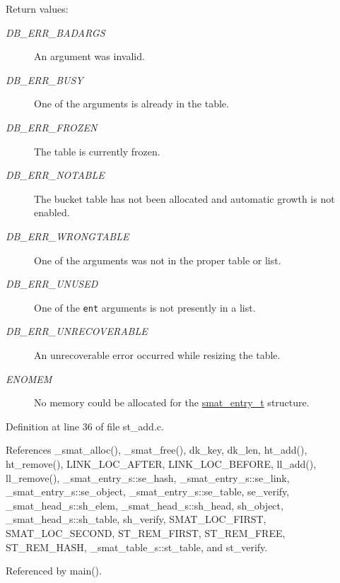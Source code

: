 \begin{Desc}
\item[Return values:]
\begin{description}
\item[{\em DB\_\-ERR\_\-BADARGS}]An argument was invalid. \item[{\em DB\_\-ERR\_\-BUSY}]One of the arguments is already in the table. \item[{\em DB\_\-ERR\_\-FROZEN}]The table is currently frozen. \item[{\em DB\_\-ERR\_\-NOTABLE}]The bucket table has not been allocated and automatic growth is not enabled. \item[{\em DB\_\-ERR\_\-WRONGTABLE}]One of the arguments was not in the proper table or list. \item[{\em DB\_\-ERR\_\-UNUSED}]One of the {\tt ent} arguments is not presently in a list. \item[{\em DB\_\-ERR\_\-UNRECOVERABLE}]An unrecoverable error occurred while resizing the table. \item[{\em ENOMEM}]No memory could be allocated for the \hyperlink{group__dbprim__smat_ga2}{smat\_\-entry\_\-t} structure.\end{description}
\end{Desc}


Definition at line 36 of file st\_\-add.c.

References \_\-smat\_\-alloc(), \_\-smat\_\-free(), dk\_\-key, dk\_\-len, ht\_\-add(), ht\_\-remove(), LINK\_\-LOC\_\-AFTER, LINK\_\-LOC\_\-BEFORE, ll\_\-add(), ll\_\-remove(), \_\-smat\_\-entry\_\-s::se\_\-hash, \_\-smat\_\-entry\_\-s::se\_\-link, \_\-smat\_\-entry\_\-s::se\_\-object, \_\-smat\_\-entry\_\-s::se\_\-table, se\_\-verify, \_\-smat\_\-head\_\-s::sh\_\-elem, \_\-smat\_\-head\_\-s::sh\_\-head, sh\_\-object, \_\-smat\_\-head\_\-s::sh\_\-table, sh\_\-verify, SMAT\_\-LOC\_\-FIRST, SMAT\_\-LOC\_\-SECOND, ST\_\-REM\_\-FIRST, ST\_\-REM\_\-FREE, ST\_\-REM\_\-HASH, \_\-smat\_\-table\_\-s::st\_\-table, and st\_\-verify.

Referenced by main().

